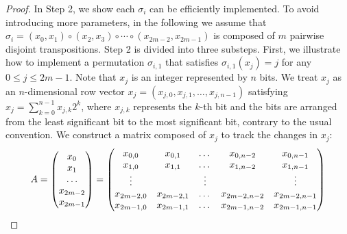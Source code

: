 \documentclass[a4paper,UKenglish,cleveref, autoref, thm-restate]{lipics-v2021}
\DeclarePairedDelimiter\rbra{\lparen}{\rparen}
\begin{document}
\begin{proof}
In Step 2, we show each $\sigma_i$ can be efficiently implemented. To avoid introducing more parameters, in the following we assume that $\sigma_i = (x_0, x_1) \circ  (x_2, x_3) \circ \cdots \circ (x_{2m-2}, x_{2m-1})$ is composed of $m$ pairwise disjoint transpositions. Step 2 is divided into three substeps. First, we illustrate how to implement a permutation $\sigma_{i,1}$ that satisfies $\sigma_{i,1}(x_j) = j$ for any $0 \leq j \leq 2m-1$. Note that $x_j$ is an integer represented by $n$ bits. We treat $x_j$ as an $n$-dimensional row vector $x_j = (x_{j, 0}, x_{j, 1}, \dots, x_{j, n-1})$ satisfying $x_j= \sum_{k=0}^{n-1} x_{j, k}2^k$, where $x_{j, k}$ represents the $k$-th bit and the bits are arranged from the least significant bit to the most significant bit, contrary to the usual convention. We construct a matrix composed of $x_j$ to track the changes in $x_j$:
\begin{align}
    A 
     = \rbra*{\begin{matrix}
        x_0 \\ x_1 \\ \dots \\ x_{2m-2} \\ x_{2m-1}
    \end{matrix} }
     = \rbra*{\begin{matrix}
        x_{0, 0} & x_{0, 1} & \dots & x_{0, n-2} & x_{0, n-1} \\
        x_{1, 0} & x_{1, 1} & \dots & x_{1, n-2} & x_{1, n-1} \\
        \vdots &&\vdots&&\vdots \\
        x_{2m-2, 0} & x_{2m-2, 1} & \dots & x_{2m-2, n-2} & x_{2m-2, n-1} \\
        x_{2m-1, 0} & x_{2m-1, 1} & \dots & x_{2m-1, n-2} & x_{2m-1, n-1} \\
    \end{matrix}}
\end{align}


\end{proof}
\end{document}
